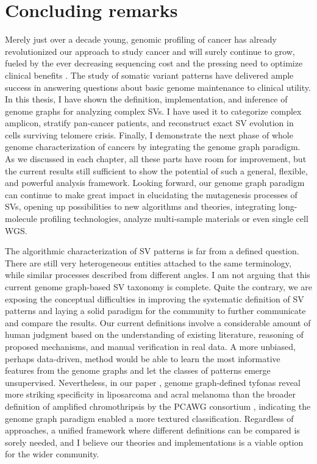 \documentclass[phd,tocprelim]{cornell}
\begin{document}
\chapter{Concluding remarks} \label{chap:conclude}
Merely just over a decade young, genomic profiling of cancer has already revolutionized our approach to study cancer and will surely continue to grow, fueled by the ever decreasing sequencing cost and the pressing need to optimize clinical benefits \cite{Stratton2009-ty}. The study of somatic variant patterns have delivered ample success in answering questions about basic genome maintenance to clinical utility. In this thesis, I have shown the definition, implementation, and inference of genome graphs for analyzing complex SVs. I have used it to categorize complex amplicon, stratify pan-cancer patients, and reconstruct exact SV evolution in cells surviving telomere crisis. Finally,  I demonstrate the next phase of whole genome characterization of cancers by integrating the genome graph paradigm. As we discussed in each chapter, all these parts have room for improvement, but the current results still sufficient to show the potential of such a general, flexible, and powerful analysis framework. Looking forward, our genome graph paradigm can continue to make great impact in elucidating the mutagenesis processes of SVs, opening up possibilities to new algorithms and theories, integrating long-molecule profiling technologies, analyze multi-sample materials or even single cell WGS.

The algorithmic characterization of SV patterns is far from a defined question. There are still very heterogeneous entities attached to the same terminology, while similar processes described from different angles. I am not arguing that this current genome graph-based SV taxonomy is complete. Quite the contrary, we are exposing the conceptual difficulties in improving the systematic definition of SV patterns and laying a solid paradigm for the community to further communicate and compare the results. Our current definitions involve a considerable amount of human judgment based on the understanding of existing literature, reasoning of proposed mechanisms, and manual verification in real data. A more unbiased, perhaps data-driven, method would be able to learn the most informative features from the genome graphs and let the classes of patterns emerge unsupervised. Nevertheless, in our paper \cite{Hadi2020-um}, genome graph-defined tyfonas reveal more striking specificity in liposarcoma and acral melanoma than the broader definition of amplified chromothripsis by the PCAWG consortium \cite{pcawg_marker2020-yi}, indicating the genome graph paradigm enabled a more textured classification. Regardless of approaches, a unified framework where different definitions can be compared is sorely needed, and I believe our theories and implementations is a viable option for the wider community.
\end{document}
